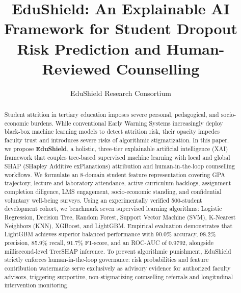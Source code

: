 \documentclass[runningheads]{llncs}
\begin{document}
\title{EduShield: An Explainable AI Framework for Student Dropout Risk Prediction and Human-Reviewed Counselling}

\author{EduShield Research Consortium}

\maketitle

\begin{abstract}
Student attrition in tertiary education imposes severe personal, pedagogical, and socio-economic burdens. While conventional Early Warning Systems increasingly deploy black-box machine learning models to detect attrition risk, their opacity impedes faculty trust and introduces severe risks of algorithmic stigmatization. In this paper, we propose \textbf{EduShield}, a holistic, three-tier explainable artificial intelligence (XAI) framework that couples tree-based supervised machine learning with local and global SHAP (SHapley Additive exPlanations) attribution and human-in-the-loop counselling workflows. We formulate an 8-domain student feature representation covering GPA trajectory, lecture and laboratory attendance, active curriculum backlogs, assignment completion diligence, LMS engagement, socio-economic standing, and confidential voluntary well-being surveys. Using an experimentally verified 500-student development cohort, we benchmark seven supervised learning algorithms: Logistic Regression, Decision Tree, Random Forest, Support Vector Machine (SVM), K-Nearest Neighbors (KNN), XGBoost, and LightGBM. Empirical evaluation demonstrates that LightGBM achieves superior balanced performance with 90.0\% accuracy, 98.2\% precision, 85.9\% recall, 91.7\% F1-score, and an ROC-AUC of 0.9792, alongside millisecond-level TreeSHAP inference. To prevent algorithmic punishment, EduShield strictly enforces human-in-the-loop governance: risk probabilities and feature contribution watermarks serve exclusively as advisory evidence for authorized faculty advisors, triggering supportive, non-stigmatizing counselling referrals and longitudinal intervention monitoring.

\end{abstract}
\end{document}
